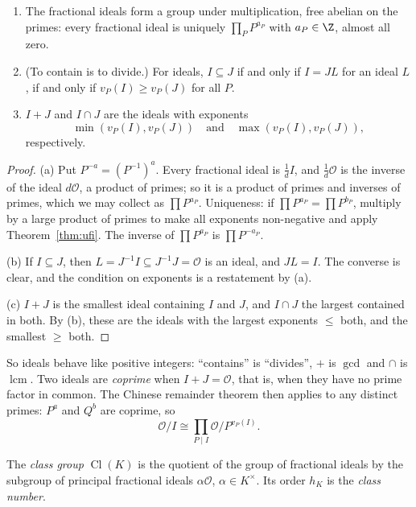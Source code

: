 \begin{corollary}\label{cor:divides}
\begin{enumerate}[label=(\alph*)]
\item The fractional ideals form a group under multiplication, free abelian on the primes: every fractional ideal is
uniquely $\prod_PP^{a_P}$ with $a_P\in\Z$, almost all zero.
\item (To contain is to divide.) For ideals, $I\subseteq J$ if and only if $I=JL$ for an ideal $L$, if and only if
$v_P(I)\ge v_P(J)$ for all $P$.
\item $I+J$ and $I\cap J$ are the ideals with exponents
\[
\min(v_P(I),v_P(J))\quad\text{and}\quad\max(v_P(I),v_P(J)),
\]
respectively.
\end{enumerate}
\end{corollary}
\begin{proof}
(a) Put $P^{-a}=(P^{-1})^a$. Every fractional ideal is $\frac1dI$, and $\frac1d\mathcal O$ is the inverse of the ideal
$d\mathcal O$, a product of primes; so it is a product of primes and inverses of primes, which we may collect as
$\prod P^{a_P}$. Uniqueness: if $\prod P^{a_P}=\prod P^{b_P}$, multiply by a large product of primes to make all
exponents non-negative and apply Theorem~\ref{thm:ufi}. The inverse of $\prod P^{a_P}$ is $\prod P^{-a_P}$.

(b) If $I\subseteq J$, then $L=J^{-1}I\subseteq J^{-1}J=\mathcal O$ is an ideal, and $JL=I$. The converse is clear, and
the condition on exponents is a restatement by (a).

(c) $I+J$ is the smallest ideal containing $I$ and $J$, and $I\cap J$ the largest contained in both. By (b), these are
the ideals with the largest exponents $\le$ both, and the smallest $\ge$ both.
\end{proof}

So ideals behave like positive integers: ``contains'' is ``divides'', $+$ is $\gcd$ and $\cap$ is $\operatorname{lcm}$.
Two ideals are \emph{coprime} when $I+J=\mathcal O$, that is, when they have no prime factor in common. The
Chinese remainder theorem then applies to any distinct primes: $P^a$ and $Q^b$ are coprime, so
\begin{equation}\label{eq:crt}
\mathcal O/I\cong\prod_{P\mid I}\mathcal O/P^{v_P(I)}.
\end{equation}

\begin{definition}
The \emph{class group} $\operatorname{Cl}(K)$ is the quotient of the group of fractional ideals by the subgroup of
principal fractional ideals $\alpha\mathcal O$, $\alpha\in K^\times$. Its order $h_K$ is the \emph{class number}.
\end{definition}

